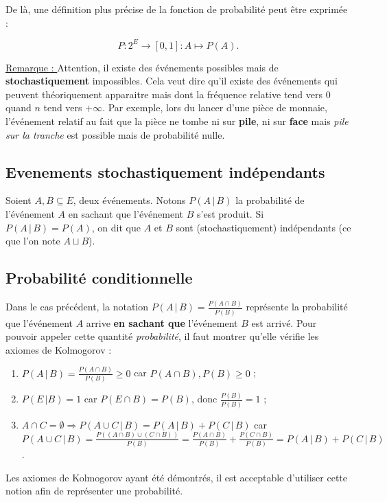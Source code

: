 \documentclass{article}
\begin{document}
		De là, une définition plus précise de la fonction de probabilité peut être exprimée :

		\[P : 2^E \to [0, 1] : A \mapsto P(A).\]

		\underline{Remarque : } Attention, il existe des événements possibles mais de \textbf{stochastiquement} impossibles. Cela veut dire qu'il existe des événements qui
		peuvent théoriquement apparaitre mais dont la fréquence relative tend vers $0$ quand $n$ tend vers $+\infty$. Par exemple, lors du lancer d'une pièce de monnaie,
		l'événement relatif au fait que la pièce ne tombe ni sur \textbf{pile}, ni sur \textbf{face} mais \textit{pile sur la tranche} est possible mais de probabilité nulle.

	\subsection{Evenements stochastiquement indépendants}
		Soient $A, B \subseteq E$, deux événements. Notons $P(A \, | \, B)$ la probabilité de l'événement $A$ en sachant que l'événement $B$ s'est produit.
		Si $P(A \, | \, B) = P(A)$, on dit que $A$ et $B$ sont (stochastiquement) indépendants (ce que l'on note $A \sqcup B$).

	\subsection{Probabilité conditionnelle}
		Dans le cas précédent, la notation $P(A \, | \, B) = \frac {P(A \cap B)}{P(B)}$ représente la probabilité que l'événement $A$ arrive \textbf{en sachant que}
		l'événement $B$ est arrivé. Pour pouvoir appeler cette quantité \textit{probabilité}, il faut montrer qu'elle vérifie les axiomes de Kolmogorov :

		\begin{enumerate}
			\item $P(A \, | \, B) = \frac {P(A \cap B)}{P(B)} \geq 0$ car $P(A \cap B), P(B) \geq 0$ ;
			\item $P(E \, | B) = 1$ car $P(E \cap B) = P(B)$, donc $\frac {P(B)}{P(B)} = 1$ ;
			\item $A \cap C = \emptyset \Rightarrow P(A \cup C \, | \, B) = P(A \, | \, B) + P(C \, | \, B)$ car
			$P(A \cup C \, | \, B) = \frac {P((A \cap B) \cup (C \cap B))}{P(B)} = \frac {P(A \cap B)}{P(B)} + \frac {P(C \cap B)}{P(B)} = P(A\, | \, B) + P(C \, | \, B)$.
		\end{enumerate}

		Les axiomes de Kolmogorov ayant été démontrés, il est acceptable d'utiliser cette notion afin de représenter une probabilité.
\end{document}
